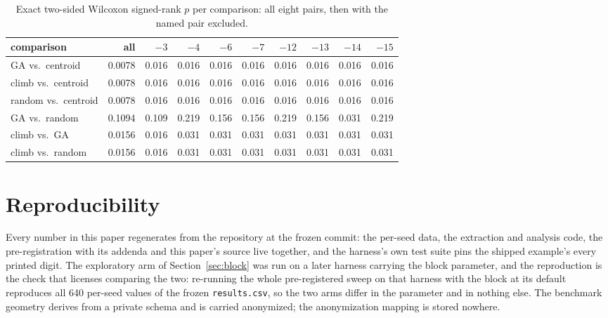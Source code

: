 \documentclass[11pt]{article}
\begin{document}
\begin{table}[h]
\centering
\caption{Exact two-sided Wilcoxon signed-rank $p$ per comparison: all eight pairs, then
with the named pair excluded.}
\label{tab:loo}
\setlength{\tabcolsep}{4.5pt}
\begin{tabular}{lr|rrrrrrrr}
\toprule
comparison & all & $-3$ & $-4$ & $-6$ & $-7$ & $-12$ & $-13$ & $-14$ & $-15$ \\
\midrule
GA vs.\ centroid     & 0.0078 & 0.016 & 0.016 & 0.016 & 0.016 & 0.016 & 0.016 & 0.016 & 0.016 \\
climb vs.\ centroid  & 0.0078 & 0.016 & 0.016 & 0.016 & 0.016 & 0.016 & 0.016 & 0.016 & 0.016 \\
random vs.\ centroid & 0.0078 & 0.016 & 0.016 & 0.016 & 0.016 & 0.016 & 0.016 & 0.016 & 0.016 \\
GA vs.\ random       & 0.1094 & 0.109 & 0.219 & 0.156 & 0.156 & 0.219 & 0.156 & 0.031 & 0.219 \\
climb vs.\ GA        & 0.0156 & 0.016 & 0.031 & 0.031 & 0.031 & 0.031 & 0.031 & 0.031 & 0.031 \\
climb vs.\ random    & 0.0156 & 0.016 & 0.031 & 0.031 & 0.031 & 0.031 & 0.031 & 0.031 & 0.031 \\
\bottomrule
\end{tabular}
\end{table}

\section*{Reproducibility}

Every number in this paper regenerates from the repository at the frozen commit: the
per-seed data, the extraction and analysis code, the pre-registration with its addenda and
this paper's source live together, and the harness's own test suite pins the shipped
example's every printed digit. The exploratory arm of Section~\ref{sec:block} was run on a
later harness carrying the block parameter, and the reproduction is the check that licenses
comparing the two: re-running the whole pre-registered sweep on that harness with the block
at its default reproduces all 640 per-seed values of the frozen \texttt{results.csv}, so the
two arms differ in the parameter and in nothing else. The benchmark geometry derives from a private schema and is
carried anonymized; the anonymization mapping is stored nowhere.
\end{document}

